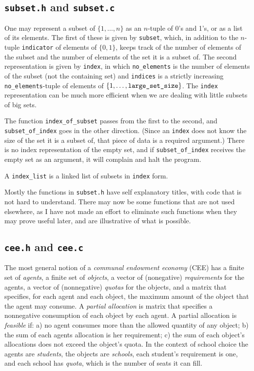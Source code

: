 \documentclass[12pt]{article}
\theoremstyle{definition}
\begin{document}
\begin{appendix}
\subsection{\texttt{subset.h} and \texttt{subset.c}}

One may represent a subset of $\{1, \ldots, n\}$ as an $n$-tuple of
0's and 1's, or as a list of its elements.  The first of these is
given by \texttt{subset}, which, in addition to the $n$-tuple
\texttt{indicator} of elements of $\{0,1\}$, keeps track of the number
of elements of the subset and the number of elements of the set it is
a subset of.  The second representation is given by \texttt{index}, in
which \texttt{no\_elements} is the number of elements of the subset
(not the containing set) and \texttt{indices} is a strictly increasing
\texttt{no\_elements}-tuple of elements of $\{1, \ldots,
\text{\texttt{large\_set\_size}}\}$.  The \texttt{index}
representation can be much more efficient when we are dealing with
little subsets of big sets.

The function
\texttt{index\_of\_subset} passes from the first to the second, and
\texttt{subset\_of\_index} goes in the other direction.  (Since an
\texttt{index} does not know the size of the set it is a subset of,
that piece of data is a required argument.) There is no index
representation of the empty set, and if \texttt{subset\_of\_index}
receives the empty set as an argument, it will complain and halt the
program.

A \texttt{index\_list} is a linked list of subsets in \texttt{index}
form.  

Mostly the functions in \texttt{subset.h} have self explanatory
titles, with code that is not hard to understand.  There may now be
some functions that are not used elsewhere, as I have not made an
effort to eliminate such functions when they may prove useful later,
and are illustrative of what is possible.

\subsection{\texttt{cee.h} and \texttt{cee.c}}

The most general notion of a \emph{communal endowment economy} (CEE)
has a finite set of \emph{agents}, a finite set of \emph{objects}, a
vector of (nonegative) \emph{requirements} for the agents, a vector of
(nonnegative) \emph{quotas} for the objects, and a matrix that
specifies, for each agent and each object, the maximum amount of the
object that the agent may consume.  A \emph{partial allocation} is
matrix that specifies a nonnegative consumption of each object by each
agent.  A partial allocation is \emph{feasible} if: a) no agent
consumes more than the allowed quantity of any object; b) the sum of
each agents allocation is her requirement; c) the sum of each object's
allocations does not exceed the object's quota.  In the context of
school choice the agents are \emph{students}, the objects are
\emph{schools}, each student's requirement is one, and each school has
\emph{quota}, which is the number of seats it can fill.


\end{appendix}
\end{document}
